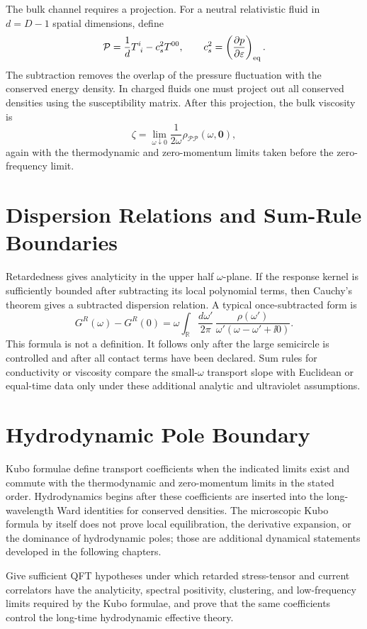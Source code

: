 The bulk channel requires a projection.  For a neutral relativistic fluid in
\(d=D-1\) spatial dimensions, define
\[
  \mathcal P
  =
  \frac{1}{d}T^i_{\ i}-c_s^2 T^{00},
  \qquad
  c_s^2=\left(\frac{\partial p}{\partial\varepsilon}\right)_{\rm eq}.
\]
The subtraction removes the overlap of the pressure fluctuation with the
conserved energy density.  In charged fluids one must project out all
conserved densities using the susceptibility matrix.  After this projection,
the bulk viscosity is
\[
  \zeta
  =
  \lim_{\omega\downarrow0}
  \frac{1}{2\omega}\rho_{\mathcal P\mathcal P}(\omega,\mathbf0),
\]
again with the thermodynamic and zero-momentum limits taken before the
zero-frequency limit.

\section{Dispersion Relations and Sum-Rule Boundaries}

Retardedness gives analyticity in the upper half \(\omega\)-plane.  If the
response kernel is sufficiently bounded after subtracting its local
polynomial terms, then Cauchy's theorem gives a subtracted dispersion
relation.  A typical once-subtracted form is
\begin{equation}
  G^R(\omega)-G^R(0)
  =
  \omega
  \int_{\mathbb R}\frac{d\omega'}{2\pi}\,
  \frac{\rho(\omega')}
       {\omega'(\omega-\omega'+\ii0)} .
  \label{eq:kubo-once-subtracted-dispersion}
\end{equation}
This formula is not a definition.  It follows only after the large semicircle
is controlled and after all contact terms have been declared.  Sum rules for
conductivity or viscosity compare the small-\(\omega\) transport slope with
Euclidean or equal-time data only under these additional analytic and
ultraviolet assumptions.

\section{Hydrodynamic Pole Boundary}

Kubo formulae define transport coefficients when the indicated limits exist
and commute with the thermodynamic and zero-momentum limits in the stated
order.  Hydrodynamics begins after these coefficients are inserted into the
long-wavelength Ward identities for conserved densities.  The microscopic
Kubo formula by itself does not prove local equilibration, the derivative
expansion, or the dominance of hydrodynamic poles; those are additional
dynamical statements developed in the following chapters.

\begin{openproblem}
\label{op:kubo-hydrodynamics-bridge}
Give sufficient QFT hypotheses under which retarded stress-tensor and current
correlators have the analyticity, spectral positivity, clustering, and
low-frequency limits required by the Kubo formulae, and prove that the same
coefficients control the long-time hydrodynamic effective theory.
\end{openproblem}
